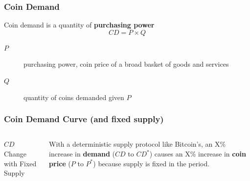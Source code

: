\documentclass{beamer}
\begin{document}
\begin{frame}
  \frametitle{Coin Demand}
  \begin{block}{Coin demand is a quantity of \textbf{purchasing power}}
    \begin{equation*}
      CD = P \times Q
    \end{equation*}
    \begin{description}
    \item[$P$] purchasing power, coin price of a broad basket of goods
      and services
    \item[$Q$] quantity of coins demanded given $P$
    \end{description}
  \end{block}
\end{frame}

\begin{frame}
  \frametitle{Coin Demand Curve (and fixed supply)}
  \begin{columns}
    \begin{block}{$CD$ Change with Fixed Supply}
    \end{block}
    With a deterministic supply protocol like Bitcoin's, an X\%
    increase in \textbf{demand} ($CD$ to $CD^{*}$) causes an X\%
    increase in \textbf{coin price} ($P$ to $P^{*}$) because supply is
    fixed in the period.
  \end{columns}
\end{frame}
\end{document}
